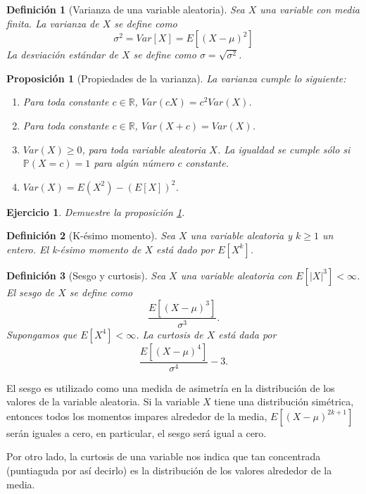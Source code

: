 \documentclass[11pt]{report}
\theoremstyle{break}
\newtheorem{definicion}{Definición}[chapter]
\newtheorem{proposicion}{Proposición}[chapter]
\newtheorem{ejercicio}{Ejercicio}[chapter]
\theoremstyle{break}
\begin{document}
\begin{definicion}[Varianza de una variable aleatoria]
Sea $X$ una variable con media finita. La varianza de $X$ se define como
$$
\sigma^2 = Var[X] =  E[(X - \mu)^2]
$$
La desviación estándar de $X$ se define como $\sigma = \sqrt{\sigma^2}$.
\end{definicion}

\begin{proposicion}[Propiedades de la varianza]
\label{proposicion:propiedades de la varianza}
La varianza cumple lo siguiente:
\begin{enumerate}[label=\alph*)]
\item Para toda constante $c \in \mathbb{R}$, $Var(cX) = c^2Var(X)$.
\item Para toda constante $c \in \mathbb{R}$, $Var(X + c) = Var(X)$.
\item $Var(X) \geq 0$, para toda variable aleatoria $X$. La igualdad se cumple sólo si $\mathbb{P}(X = c)=1$ para algún número $c$ constante.
\item $Var(X) = E(X^2) - (E[X])^2$.
\end{enumerate}
\end{proposicion}

\begin{ejercicio}
Demuestre la proposición \ref{proposicion:propiedades de la varianza}.
\end{ejercicio}

\begin{definicion}[K-ésimo momento]
Sea $X$ una variable aleatoria y $k \geq 1$ un entero. El k-ésimo momento de $X$ está dado por $E[X^k]$.
\end{definicion}

\begin{definicion}[Sesgo y curtosis]
\label{definicion:sesgo y curtosis}
Sea $X$ una variable aleatoria con $E[|X|^3]<\infty$. El sesgo de $X$ se define como
$$
\dfrac{E[(X- \mu)^3]}{\sigma^3}.
$$
Supongamos que $E[X^4] < \infty$. La curtosis de $X$ está dada por
$$
\dfrac{E[(X - \mu)^4]}{\sigma^4} - 3.
$$
\end{definicion}
El sesgo es utilizado como una medida de asimetría en la distribución de los valores de la variable aleatoria. Si la variable $X$ tiene una distribución simétrica, entonces todos los momentos impares alrededor de la media, $E[(X - \mu)^{2k + 1}]$ serán iguales a cero, en particular, el sesgo será igual a cero.

Por otro lado, la curtosis de una variable nos indica que tan concentrada (puntiaguda por así decirlo) es la distribución de los valores alrededor de la media.
\end{document}

